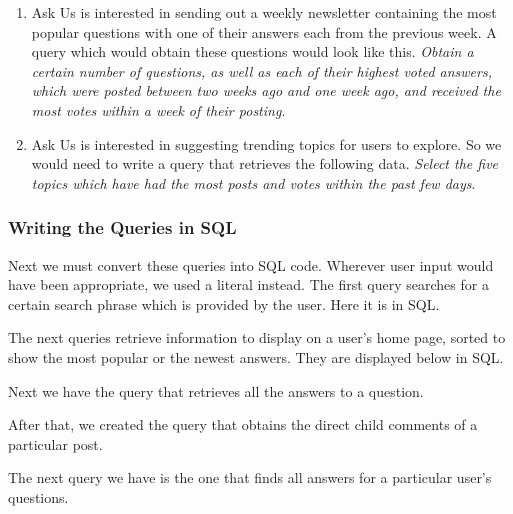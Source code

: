 \begin{enumerate}
	\item
	Ask Us is interested in sending out a weekly newsletter containing the most popular questions with one of their answers each from the previous week. A query which would obtain these questions would look like this. \emph{Obtain a certain number of questions, as well as each of their highest voted answers, which were posted between two weeks ago and one week ago, and received the most votes within a week of their posting}.

	\item
	Ask Us is interested in suggesting trending topics for users to explore. So we would need to write a query that retrieves the following data. \emph{Select the five topics which have had the most posts and votes within the past few days}.

\end{enumerate}

\subsubsection{Writing the Queries in SQL}

Next we must convert these queries into SQL code. Wherever user input would have been appropriate, we used a literal instead. The first query searches for a certain search phrase which is provided by the user. Here it is in SQL.


The next queries retrieve information to display on a user's home page, sorted to show the most popular or the newest answers. They are displayed below in SQL.


Next we have the query that retrieves all the answers to a question.


After that, we created the query that obtains the direct child comments of a particular post.


The next query we have is the one that finds all answers for a particular user's questions.

